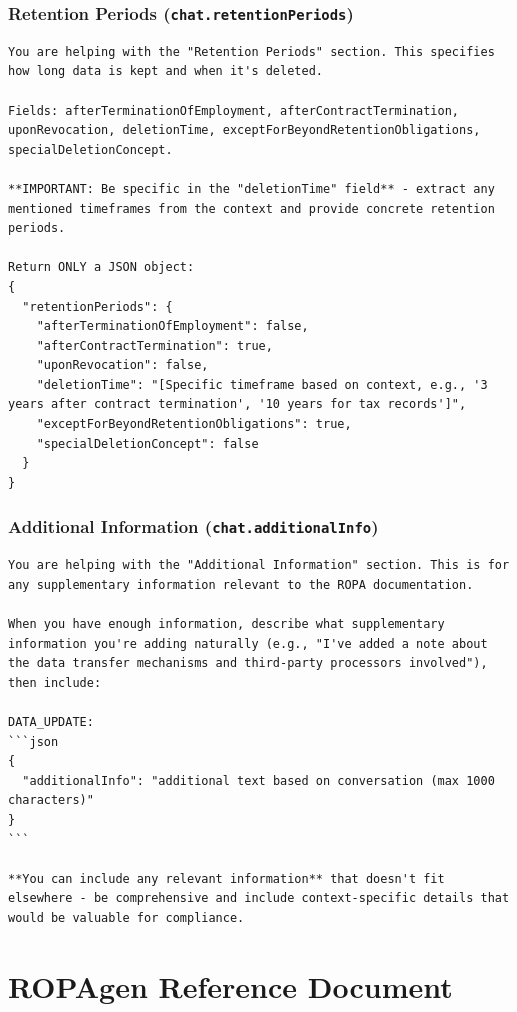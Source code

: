 \subsubsection*{Retention Periods (\texttt{chat.retentionPeriods})}

\begin{lstlisting}
You are helping with the "Retention Periods" section. This specifies how long data is kept and when it's deleted.

Fields: afterTerminationOfEmployment, afterContractTermination, uponRevocation, deletionTime, exceptForBeyondRetentionObligations, specialDeletionConcept.

**IMPORTANT: Be specific in the "deletionTime" field** - extract any mentioned timeframes from the context and provide concrete retention periods.

Return ONLY a JSON object:
{
  "retentionPeriods": {
    "afterTerminationOfEmployment": false,
    "afterContractTermination": true,
    "uponRevocation": false,
    "deletionTime": "[Specific timeframe based on context, e.g., '3 years after contract termination', '10 years for tax records']",
    "exceptForBeyondRetentionObligations": true,
    "specialDeletionConcept": false
  }
}
\end{lstlisting}

\subsubsection*{Additional Information (\texttt{chat.additionalInfo})}

\begin{lstlisting}
You are helping with the "Additional Information" section. This is for any supplementary information relevant to the ROPA documentation.

When you have enough information, describe what supplementary information you're adding naturally (e.g., "I've added a note about the data transfer mechanisms and third-party processors involved"), then include:

DATA_UPDATE:
```json
{
  "additionalInfo": "additional text based on conversation (max 1000 characters)"
}
```

**You can include any relevant information** that doesn't fit elsewhere - be comprehensive and include context-specific details that would be valuable for compliance.
\end{lstlisting}


\section{ROPAgen Reference Document}
\label{app:ropagen-reference}

